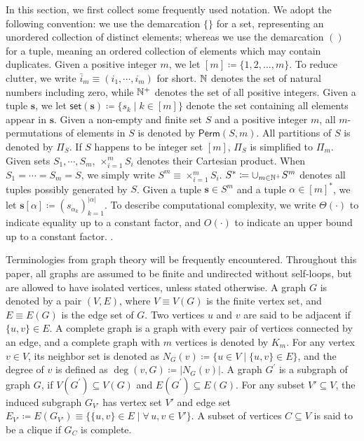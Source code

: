 \documentclass[letterpaper,11pt]{article}
\newcommand{\takesetp}[1]{\mathsf{set}(#1)}
\newcommand{\perm}[1]{\mathsf{Perm}(#1)}
\newcommand{\partition}{\Pi}
\newcommand{\partitionp}[1]{\partition_{#1}}
\newcommand{\degp}[2]{\deg(#1,#2)}
\newcommand{\completegraphp}[1]{K_{#1}}
\newcommand{\less}{O}
\newcommand{\appequal}{\Theta}
\begin{document}
\begin{bibunit}[plainnat]
In this section, we first collect some frequently used notation. We adopt the following convention: we use the demarcation $\{\}$ for a set, representing an unordered collection of distinct elements; whereas we use the demarcation $()$ for a tuple, meaning an ordered collection of elements which may contain duplicates. Given a positive integer $m$, we let $[m] \coloneqq \{1, 2, \ldots, m\}$. To reduce clutter, we write $\bar{i}_{m} \equiv (i_{1}, \cdots, i_{m})$ for short. $\mathbb{N}$ denotes the set of natural numbers including zero, while $\mathbb{N}^+$ denotes the set of all positive integers. Given a tuple $\bm{s}$, we let $\takesetp{\bm{s}} \coloneqq \{s_k \mid k\in [m]\}$ denote the set containing all elements appear in $\bm{s}$. Given a non-empty and finite set $S$ and a positive integer $m$, all $m$-permutations of elements in $S$ is denoted by $\perm{S, m}$. All partitions of $S$ is denoted by $\partitionp{S}$. If $S$ happens to be integer set $[m]$, $\partitionp{S}$ is simplified to $\partitionp{m}$. Given sets $S_{1}, \cdots, S_{m}$, $\times_{i = 1}^{m} S_{i}$ denotes their Cartesian product. When $S_{1} = \cdots = S_{m} = S$, we simply write $S^{m} \equiv \times_{i = 1}^{m} S_{i}$. $S^* \coloneqq \cup_{m \in \mathbb{N}^+} S^m$ denotes all tuples possibly generated by $S$. Given a tuple $\bm{s} \in S^m$ and a tuple $\alpha \in [m]^*$, we let $\bm{s}[\alpha] \coloneqq (s_
{\alpha_k})_{k=1}^{|\alpha|}$. To describe computational complexity, we write $\appequal(\cdot)$ to indicate equality up to a constant factor, and $\less(\cdot)$ to indicate an upper bound up to a constant factor.
.

Terminologies from graph theory will be frequently encountered. Throughout this paper, all graphs are assumed to be finite and undirected without self-loops, but are allowed to have isolated vertices, unless stated otherwise. A graph $G$ is denoted by a pair $(V, E)$, where $V \equiv V (G)$ is the finite vertex set, and $E \equiv E (G)$ is the edge set of $G$. Two vertices $u$ and $v$ are said to be adjacent if $\{u, v\} \in E$. A complete graph is a graph with every pair of vertices connected by an edge, and a complete graph with $m$ vertices is denoted by $\completegraphp{m}$. For any vertex $v \in V$, its neighbor set is denoted as $N_G (v) \coloneqq \{ u \in V \mid \{u, v\} \in E \}$, and the degree of $v$ is defined as $\degp{v}{G} \coloneqq |N_G(v)|$. A graph $G^\prime$ is a subgraph of graph $G$, if $V (G^\prime) \subseteq V (G)$ and $E (G^\prime) \subseteq E (G)$. For any subset $V' \subseteq V$, the induced subgraph $G_{V'}$ has vertex set $V'$ and edge set $E_{V'} \coloneqq E (G_{V'}) \equiv \{\{u, v\} \in E \mid \forall \, u, v \in V'\}$. A subset of vertices $C \subseteq V$ is said to be a clique if $G_{C}$ is complete.



\end{bibunit}
\end{document}
